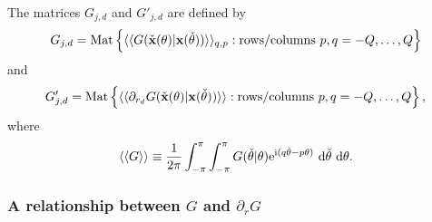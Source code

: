 \documentclass[12pt,a4paper]{article}
\newcommand{\wrt}{ ~ {\rm d}}
\newcommand{\mat}{\textrm{Mat}}
\def\ci{{\mathrm i}}
\renewcommand{\exp}{{\rm e}}
\newcommand{\bx}{{\bf x}}
\newcommand{\bxo}{\check{\textbf{x}}}
\newcommand{\tho}{\check{\theta}}
\begin{document}
The matrices $G_{j,d}$ and $G'_{j,d}$ are defined by
\begin{equation}
G_{j,d}
=
\mat
\left\{
\langle\langle
G(\bxo(\theta)\vert\bx(\tho))
\rangle\rangle_{q,p}
:
\text{rows/columns }
p,q=-Q,\dots,Q
\right\}
\end{equation}
and
\begin{equation}
G_{j,d}'
=
\mat
\left\{
\langle\langle
\partial_{r_{d}}
G(\bxo(\theta)\vert\bx(\tho))
\rangle\rangle
:
\text{rows/columns }
p,q=-Q,\dots,Q
\right\},
\end{equation}
where
\begin{equation}
\langle\langle
G
\rangle\rangle
\equiv
\frac{1}{2\pi}
\int_{-\pi}^{\pi}
\int_{-\pi}^{\pi}
G(\tho\vert \theta)
\exp^{\ci(q\tho -p\theta)}
\wrt\tho\wrt\theta.
\end{equation}


%

\subsubsection{A relationship between $G$ and $\partial_{r}G$}
\end{document}
